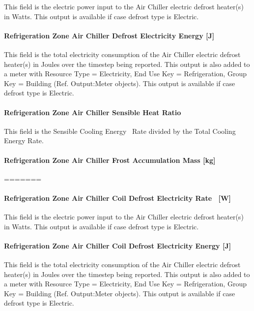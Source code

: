 This field is the electric power input to the Air Chiller electric defrost heater(s) in Watts. This output is available if case defrost type is Electric.

\paragraph{Refrigeration Zone Air Chiller Defrost Electricity Energy {[}J{]}}\label{refrigeration-zone-air-chiller-defrost-electric-energy-j}

This field is the total electricity consumption of the Air Chiller electric defrost heater(s) in Joules over the timestep being reported. This output is also added to a meter with Resource Type = Electricity, End Use Key = Refrigeration, Group Key = Building (Ref. Output:Meter objects). This output is available if case defrost type is Electric.

\paragraph{Refrigeration Zone Air Chiller Sensible Heat Ratio}\label{refrigeration-zone-air-chiller-sensible-heat-ratio}

This field is the Sensible Cooling Energy ~Rate divided by the Total Cooling Energy Rate.

\paragraph{Refrigeration Zone Air Chiller Frost Accumulation Mass {[}kg{]}}\label{refrigeration-zone-air-chiller-frost-accumulation-mass-kg}
=======
\paragraph{Refrigeration Zone Air Chiller Coil Defrost Electricity Rate~ {[}W{]}}\label{refrigeration-zone-air-chiller-coil-defrost-electric-power-w}

This field is the electric power input to the Air Chiller electric defrost heater(s) in Watts. This output is available if case defrost type is Electric.

\paragraph{Refrigeration Zone Air Chiller Coil Defrost Electricity Energy {[}J{]}}\label{refrigeration-zone-air-chiller-coil-defrost-electric-energy-j}

This field is the total electricity consumption of the Air Chiller electric defrost heater(s) in Joules over the timestep being reported. This output is also added to a meter with Resource Type = Electricity, End Use Key = Refrigeration, Group Key = Building (Ref. Output:Meter objects). This output is available if case defrost type is Electric.

